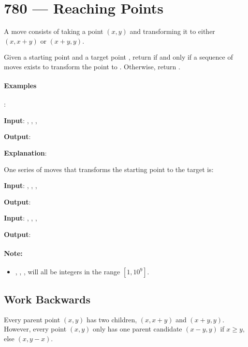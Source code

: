 \section{780 --- Reaching Points}
A move consists of taking a point $ (x, y) $ and transforming it to either $ (x, x+y) $ or $ (x+y, y) $.

Given a starting point    and a target point   , return  if and only if a sequence of moves exists to transform the point  to . Otherwise, return .

\paragraph{Examples}:
\begin{flushleft}


\textbf{Input}: , , , 

\textbf{Output}: 

\textbf{Explanation}:

One series of moves that transforms the starting point to the target is:




\textbf{Input}: , , , 

\textbf{Output}: 

\textbf{Input}: , , , 

\textbf{Output}: 
\end{flushleft}

\paragraph{Note:}

\begin{itemize}
\item {}, , ,  will all be integers in the range $[1, 10^9]$.
\end{itemize}

\subsection{Work Backwards}
Every parent point $(x, y)$ has two children, $(x, x+y)$ and $(x+y, y)$. However, every point $(x, y)$ only has one parent candidate $(x-y, y)$ if $x \geq y$, else $(x, y-x)$.

